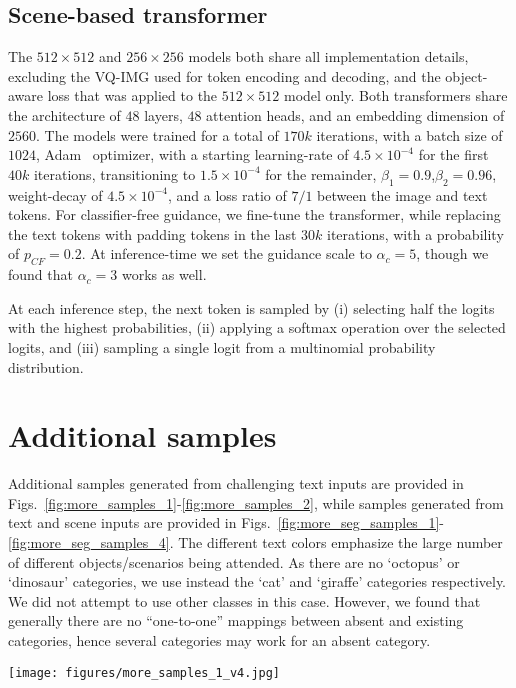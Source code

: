 \documentclass[final]{cvpr}
\begin{document}
\subsection{Scene-based transformer}
The $512\times512$ and $256\times256$ models both share all implementation details, excluding the VQ-IMG used for token encoding and decoding, and the object-aware loss that was applied to the $512\times512$ model only. Both transformers share the architecture of $48$ layers, $48$ attention heads, and an embedding dimension of $2560$. The models were trained for a total of $170k$ iterations, with a batch size of $1024$, Adam~\cite{kingma2014adam} optimizer, with a starting learning-rate of $4.5\times10^{-4}$ for the first $40k$ iterations, transitioning to $1.5\times10^{-4}$ for the remainder, $\beta_1=0.9$,$\beta_2=0.96$, weight-decay of $4.5\times10^{-4}$, and a loss ratio of $7/1$ between the image and text tokens.
For classifier-free guidance, we fine-tune the transformer, while replacing the text tokens with padding tokens in the last $30k$ iterations, with a probability of $p_{CF}=0.2$. At inference-time we set the guidance scale to $\alpha_c=5$, though we found that $\alpha_c=3$ works as well.

At each inference step, the next token is sampled by (i) selecting half the logits with the highest probabilities, (ii) applying a softmax operation over the selected logits, and (iii) sampling a single logit from a multinomial probability distribution.


\section{Additional samples}
Additional samples generated from challenging text inputs are provided in Figs.~\ref{fig:more_samples_1}-\ref{fig:more_samples_2}, while samples generated from text and scene inputs are provided in Figs.~\ref{fig:more_seg_samples_1}-\ref{fig:more_seg_samples_4}. The different text colors emphasize the large number of different objects/scenarios being attended. As there are no `octopus' or `dinosaur' categories, we use instead the `cat' and `giraffe' categories respectively. We did not attempt to use other classes in this case. However, we found that generally there are no ``one-to-one'' mappings between absent and existing categories, hence several categories may work for an absent category.

\begin{figure*}[t]
    \centering
    \texttt{[image: figures/more\_samples\_1\_v4.jpg]}
    \caption{Additional samples generated from challenging text inputs.}
    \label{fig:more_samples_1}
\end{figure*}
\end{document}
